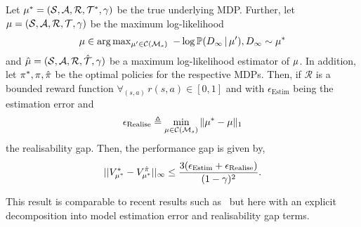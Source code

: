 \begin{theorem}\label{lemma:non-realisable}
Let $\mu^* = (\mathcal{S}, \mathcal{A}, \mathcal{R}, \mathcal{T}^*, \gamma)$ be the true underlying MDP. Further, let $\mu = (\mathcal{S}, \mathcal{A}, \mathcal{R}, \mathcal{T}, \gamma)$ be the maximum log-likelihood $$\mu \in \arg\max\nolimits_{\mu' \in \mathcal{C}(\mathcal{M}_s)}~- \log \mathbb{P}(D_\infty \, | \, \mu'), D_\infty \sim \mu^{*}$$ and $\hat{\mu} = (\mathcal{S}, \mathcal{A}, \mathcal{R}, \hat{\mathcal{T}}, \gamma)$ be a maximum log-likelihood estimator of $\mu$. In addition, let $\pi^*, \pi, \hat{\pi}$ be the optimal policies for the respective MDPs. Then, if $\mathcal{R}$ is a bounded reward function $\forall_{(s, a)} \, r(s, a) \in [0, 1]$ and with $\epsilon_{\mathrm{Estim}}$ being the estimation error and $$\epsilon_{\mathrm{Realise}} \triangleq \min_{\mu \in \mathcal{C}(\mathcal{M}_s)}\|\mu^{*}-\mu\|_1 $$ the realisability gap. Then, the performance gap is given by,
\begin{equation}
    ||V_{\mu^*}^*-V_{\mu^*}^{\hat{\pi}}||_\infty \leq \frac{3(\epsilon_{\mathrm{Estim}}+\epsilon_{\mathrm{Realise}})}{(1-\gamma)^2}.
\end{equation}

\end{theorem}
This result is comparable to recent results such as~\citep{zhang2020multi} but here with an explicit decomposition into model estimation error and realisability gap terms.

